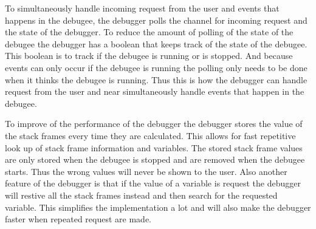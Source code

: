 To simultaneously handle incoming request from the user and events that happens in the \gls{debugee}, the debugger polls the channel for incoming request and the state of the debugger.
To reduce the amount of polling of the state of the \gls{debugee} the debugger has a boolean that keeps track of the state of the \gls{debugee}.
This boolean is to track if the \gls{debugee} is running or is stopped.
And because events can only occur if the \gls{debugee} is running the polling only needs to be done when it thinks the \gls{debugee} is running.
Thus this is how the debugger can handle request from the user and near simultaneously handle events that happen in the \gls{debugee}.


To improve of the performance of the debugger the debugger stores the value of the stack frames every time they are calculated.
This allows for fast repetitive look up of stack frame information and variables.
The stored stack frame values are only stored when the \gls{debugee} is stopped and are removed when the \gls{debugee} starts.
Thus the wrong values will never be shown to the user.
Also another feature of the debugger is that if the value of a variable is request the debugger will restive all the stack frames instead and then search for the requested variable.
This simplifies the implementation a lot and will also make the debugger faster when repeated request are made.

